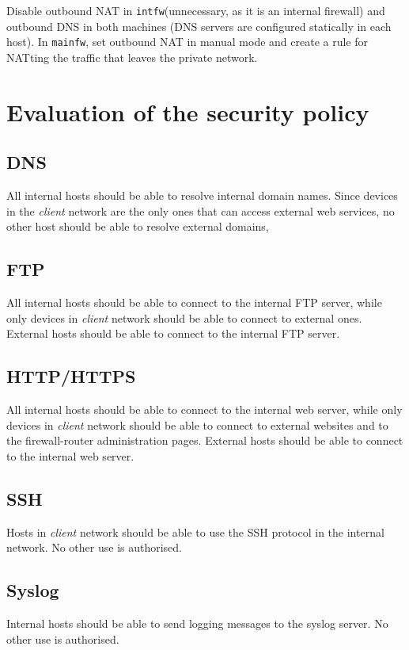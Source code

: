 \documentclass[draft]{homework}
\newcommand{\intfw}{\texttt{intfw}\xspace}
\newcommand{\mainfw}{\texttt{mainfw}\xspace}
\begin{document}
    Disable outbound NAT in \intfw (unnecessary, as it is an internal firewall) and outbound DNS in both machines (DNS servers are configured statically in each host). In \mainfw, set outbound NAT in manual mode and create a rule for NATting the traffic that leaves the private network.
    
    
    \section{Evaluation of the security policy}
    \subsection{DNS}
    All internal hosts should be able to resolve internal domain names.
    Since devices in the \textit{client} network are the only ones that can access external web services, no other host should be able to resolve external domains,
    
    \subsection{FTP}
    All internal hosts should be able to connect to the internal FTP server, while only devices in \textit{client} network should be able to connect to external ones.
    External hosts should be able to connect to the internal FTP server.
    
    \subsection{HTTP/HTTPS}
    All internal hosts should be able to connect to the internal web server, while only devices in \textit{client} network should be able to connect to external websites and to the firewall-router administration pages.
    External hosts should be able to connect to the internal web server.
    
    \subsection{SSH}
    Hosts in \textit{client} network should be able to use the SSH protocol in the internal network.
    No other use is authorised.
    
    \subsection{Syslog}
    Internal hosts should be able to send logging messages to the syslog server.
    No other use is authorised.
    
\end{document}
